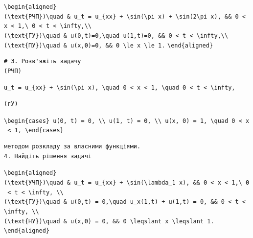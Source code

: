\documentclass[
  ukrainian,
]{article}
\begin{document}
\texttt{\textbackslash{}begin\{aligned\}}
\texttt{(\textbackslash{}text\{РЧП\})\textbackslash{}quad\ \&\ u\_t\ =\ u\_\{xx\}\ +\ \textbackslash{}sin(\textbackslash{}pi\ x)\ +\ \textbackslash{}sin(2\textbackslash{}pi\ x),\ \&\&\ 0\ \textless{}\ x\ \textless{}\ 1,\textbackslash{}\ 0\ \textless{}\ t\ \textless{}\ \textbackslash{}infty,\textbackslash{}\textbackslash{}}
\texttt{(\textbackslash{}text\{ГУ\})\textbackslash{}quad\ \&\ u(0,t)=0,\textbackslash{}quad\ u(1,t)=0,\ \&\&\ 0\ \textless{}\ t\ \textless{}\ \textbackslash{}infty,\textbackslash{}\textbackslash{}}
\texttt{(\textbackslash{}text\{ПУ\})\textbackslash{}quad\ \&\ u(x,0)=0,\ \&\&\ 0\ \textbackslash{}le\ x\ \textbackslash{}le\ 1.}
\texttt{\textbackslash{}end\{aligned\}}

\begin{verbatim}
# 3. Розв'яжіть задачу
(PЧП)
\end{verbatim}

\texttt{u\_t\ =\ u\_\{xx\}\ +\ \textbackslash{}sin(\textbackslash{}pi\ x),\ \textbackslash{}quad\ 0\ \textless{}\ x\ \textless{}\ 1,\ \textbackslash{}quad\ 0\ \textless{}\ t\ \textless{}\ \textbackslash{}infty,}

\begin{verbatim}
(гУ)
\end{verbatim}

\texttt{\textbackslash{}begin\{cases\}\ u(0,\ t)\ =\ 0,\ \textbackslash{}\textbackslash{}\ u(1,\ t)\ =\ 0,\ \textbackslash{}\textbackslash{}\ u(x,\ 0)\ =\ 1,\ \textbackslash{}quad\ 0\ \textless{}\ x\ \textless{}\ 1,\ \textbackslash{}end\{cases\}}

\begin{verbatim}
методом розкладу за власними функціями.
4. Найдіть рішення задачі
\end{verbatim}

\texttt{\textbackslash{}begin\{aligned\}}
\texttt{(\textbackslash{}text\{УЧП\})\textbackslash{}quad\ \&\ u\_t\ =\ u\_\{xx\}\ +\ \textbackslash{}sin(\textbackslash{}lambda\_1\ x),\ \&\&\ 0\ \textless{}\ x\ \textless{}\ 1,\textbackslash{}\ 0\ \textless{}\ t\ \textless{}\ \textbackslash{}infty,\ \textbackslash{}\textbackslash{}}
\texttt{(\textbackslash{}text\{ГУ\})\textbackslash{}quad\ \&\ u(0,t)\ =\ 0,\textbackslash{}quad\ u\_x(1,t)\ +\ u(1,t)\ =\ 0,\ \&\&\ 0\ \textless{}\ t\ \textless{}\ \textbackslash{}infty,\ \textbackslash{}\textbackslash{}}
\texttt{(\textbackslash{}text\{НУ\})\textbackslash{}quad\ \&\ u(x,0)\ =\ 0,\ \&\&\ 0\ \textbackslash{}leqslant\ x\ \textbackslash{}leqslant\ 1.}
\texttt{\textbackslash{}end\{aligned\}}
\end{document}
